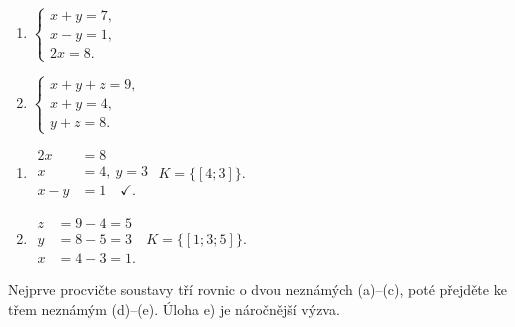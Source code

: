\documentclass[11pt,a4paper]{article}
\begin{document}
\begin{zadaniReseniBox}[title={Samostatná práce 1}]
\begin{enumerate}[label=\alph*)]
\item $\begin{cases}x+y=7,\\x-y=1,\\2x=8.\end{cases}$
\item $\begin{cases}x+y+z=9,\\x+y=4,\\y+z=8.\end{cases}$
\end{enumerate}
\tcblower
\begin{enumerate}[label=\alph*)]
\item \(\begin{aligned}2x&=8\\x&=4,\ y=3\\x-y&=1\quad\checkmark.\end{aligned}\) $K=\{[4;3]\}$.
\item \(\begin{aligned}z&=9-4=5\\y&=8-5=3\\x&=4-3=1.\end{aligned}\) $K=\{[1;3;5]\}$.
\end{enumerate}
\end{zadaniReseniBox}
Nejprve procvičte soustavy tří rovnic o dvou neznámých (a)--(c), poté přejděte ke třem neznámým (d)--(e). Úloha e) je náročnější výzva.
\end{document}
